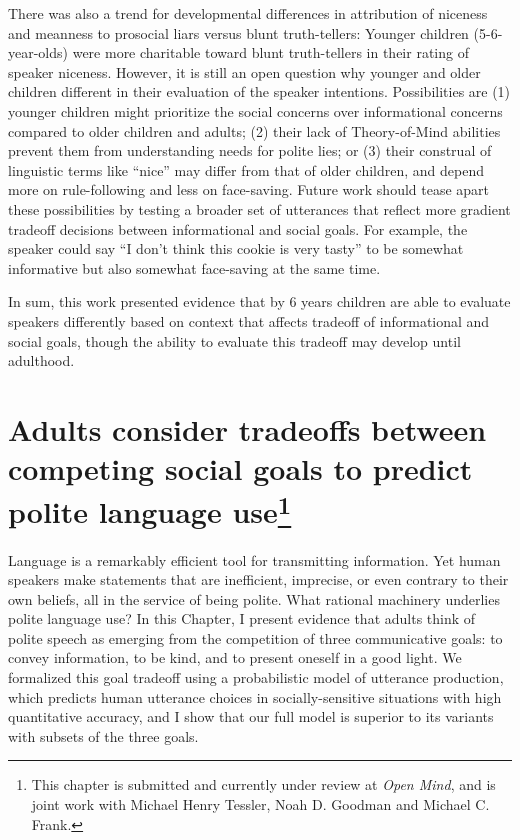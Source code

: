 \documentclass[oneside]{report}
\begin{document}
There was also a trend for developmental differences in attribution of
niceness and meanness to prosocial liars versus blunt truth-tellers:
Younger children (5-6-year-olds) were more charitable toward blunt
truth-tellers in their rating of speaker niceness. However, it is still
an open question why younger and older children different in their
evaluation of the speaker intentions. Possibilities are (1) younger
children might prioritize the social concerns over informational
concerns compared to older children and adults; (2) their lack of
Theory-of-Mind abilities prevent them from understanding needs for
polite lies; or (3) their construal of linguistic terms like ``nice''
may differ from that of older children, and depend more on
rule-following and less on face-saving. Future work should tease apart
these possibilities by testing a broader set of utterances that reflect
more gradient tradeoff decisions between informational and social goals.
For example, the speaker could say ``I don't think this cookie is very
tasty'' to be somewhat informative but also somewhat face-saving at the
same time.

In sum, this work presented evidence that by 6 years children are able
to evaluate speakers differently based on context that affects tradeoff
of informational and social goals, though the ability to evaluate this
tradeoff may develop until adulthood.

\chapter[Adults consider tradeoffs between competing social goals to
predict polite language use]{\texorpdfstring{Adults consider tradeoffs
between competing social goals to predict polite language use\footnote{This
  chapter is submitted and currently under review at \emph{Open Mind},
  and is joint work with Michael Henry Tessler, Noah D. Goodman and
  Michael C. Frank.}}{Adults consider tradeoffs between competing social goals to predict polite language use}}\label{adults-consider-tradeoffs-between-competing-social-goals-to-predict-polite-language-use}


Language is a remarkably efficient tool for transmitting information.
Yet human speakers make statements that are inefficient, imprecise, or
even contrary to their own beliefs, all in the service of being polite.
What rational machinery underlies polite language use? In this Chapter,
I present evidence that adults think of polite speech as emerging from
the competition of three communicative goals: to convey information, to
be kind, and to present oneself in a good light. We formalized this goal
tradeoff using a probabilistic model of utterance production, which
predicts human utterance choices in socially-sensitive situations with
high quantitative accuracy, and I show that our full model is superior
to its variants with subsets of the three goals.
\end{document}
